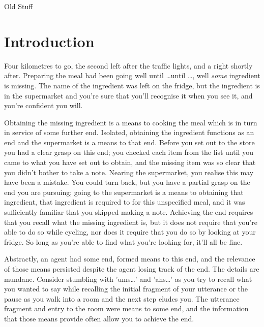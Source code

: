 \documentclass[10pt]{article}
\begin{document}
\newpage
\maketitle









\newpage

\begin{center}
  {\color{red} \Huge Old Stuff}
\end{center}

\section{Introduction}
\label{sec:introduction}

Four kilometres to go, the second left after the traffic lights, and a right shortly after.
Preparing the meal had been going well until \dots until \dots, well \emph{some} ingredient is missing.
The name of the ingredient was left on the fridge, but the ingredient is in the supermarket and you're sure that you'll recognise it when you see it, and you're confident you will.

Obtaining the missing ingredient is a means to cooking the meal which is in turn in service of some further end.
Isolated, obtaining the ingredient functions as an end and the supermarket is a means to that end.
Before you set out to the store you had a clear grasp on this end; you checked each item from the list until you came to what you have set out to obtain, and the missing item was so clear that you didn't bother to take a note.
Nearing the supermarket, you realise this may have been a mistake.
You could turn back, but you have a partial grasp on the end you are pursuing; going to the supermarket is a means to obtaining that ingredient, that ingredient is required to for this unspecified meal, and it was sufficiently familiar that you skipped making a note.
Achieving the end requires that you recall what the missing ingredient is, but it does not require that you're able to do so while cycling, nor does it require that you do so by looking at your fridge.
So long as you're able to find what you're looking for, it'll all be fine.

Abstractly, an agent had some end, formed means to this end, and the relevance of those means persisted despite the agent losing track of the end.
The details are mundane.
Consider stumbling with 'ums\dots' and 'ahs\dots' as you try to recall what you wanted to say while recalling the initial fragment of your utterance or the pause as you walk into a room and the next step eludes you.
The utterance fragment and entry to the room were means to some end, and the information that those means provide often allow you to achieve the end.
\end{document}
